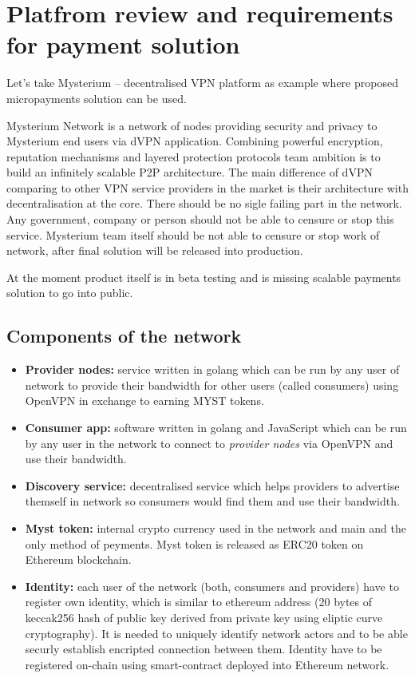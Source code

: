 \documentclass[a4paper,12pt]{article}
\begin{document}
\section{Platfrom review and requirements for payment solution}

Let's take Mysterium -- decentralised VPN platform as example where proposed 
micropayments solution can be used.

Mysterium Network is a network of nodes providing security and privacy to 
Mysterium end users via dVPN application. Combining powerful encryption, 
reputation mechanisms and layered protection protocols team ambition is to build
an infinitely scalable P2P architecture. The main difference of dVPN comparing
to other VPN service providers in the market is their architecture with 
decentralisation at the core. There should be no sigle failing part in the 
network. Any government, company or person should not be able to censure or stop
this service. Mysterium team itself should be not able to censure or stop work
of network, after final solution will be released into production.

At the moment product itself is in beta testing and is missing scalable payments
solution to go into public.

\subsection{Components of the network}

\begin{itemize}
    \item \textbf{Provider nodes:} service written in golang which can be run by
    any user of network to provide their bandwidth for other users (called 
    consumers) using OpenVPN in exchange to earning MYST tokens.
    \item \textbf{Consumer app:} software written in golang and JavaScript which
    can be run by any user in the network to connect to \textit{provider nodes} 
    via OpenVPN and use their bandwidth.
    \item \textbf{Discovery service:} decentralised service which helps
    providers to advertise themself in network so consumers would find them and 
    use their bandwidth.
    \item \textbf{Myst token:} internal crypto currency used in the network and 
    main and the only method of peyments. Myst token is released as ERC20 token 
    on Ethereum blockchain.
    \item \textbf{Identity:} each user of the network (both, consumers and 
    providers) have to register own identity, which is similar to ethereum 
    address (20 bytes of keccak256 hash of public key derived from private key 
    using eliptic curve cryptography). It is needed to uniquely identify network
    actors and to be able securly establish encripted connection between them. 
    Identity have to be registered on-chain using smart-contract deployed into 
    Ethereum network.
\end{itemize}
\end{document}
